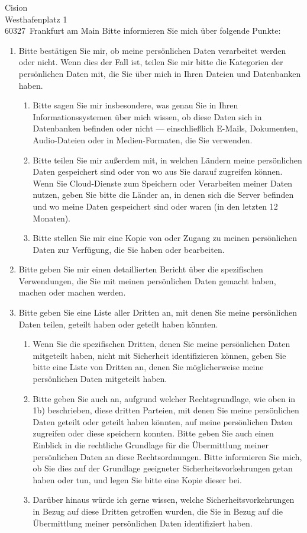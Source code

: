 \documentclass[a4paper, 12pt, KOMAold]{scrlttr2}
\newcommand{\Empfaenger}{Cision}            %
\newcommand{\EStrasse}{Westhafenplatz 1}    %
\newcommand{\EPLZ}{60327}                   %
\newcommand{\EOrt}{Frankfurt am Main}       %
\begin{document}
\begin{letter}{\Empfaenger \\ \EStrasse \\ \EPLZ~\EOrt}
    Bitte informieren Sie mich über folgende Punkte:
    \begin{enumerate}
        \item Bitte bestätigen Sie mir, ob meine persönlichen Daten verarbeitet werden oder nicht. Wenn dies der Fall ist, teilen Sie mir bitte die Kategorien der persönlichen Daten mit, die Sie über mich in Ihren Dateien und Datenbanken haben.
        \begin{enumerate}
            \item Bitte sagen Sie mir insbesondere, was genau Sie in Ihren Informationssystemen über mich wissen, ob diese Daten sich in Datenbanken befinden oder nicht — einschließlich E-Mails, Dokumenten, Audio-Dateien oder in Medien-Formaten, die Sie verwenden.
            \item Bitte teilen Sie mir außerdem mit, in welchen Ländern meine persönlichen Daten gespeichert sind oder von wo aus Sie darauf zugreifen können. Wenn Sie Cloud-Dienste zum Speichern oder Verarbeiten meiner Daten nutzen, geben Sie bitte die Länder an, in denen sich die Server befinden und wo meine Daten gespeichert sind oder waren (in den letzten 12 Monaten).
            \item Bitte stellen Sie mir eine Kopie von oder Zugang zu meinen persönlichen Daten zur Verfügung, die Sie haben oder bearbeiten.
        \end{enumerate}
        \item Bitte geben Sie mir einen detaillierten Bericht über die spezifischen Verwendungen, die Sie mit meinen persönlichen Daten gemacht haben, machen oder machen werden.
        \item Bitte geben Sie eine Liste aller Dritten an, mit denen Sie meine persönlichen Daten teilen, geteilt haben oder geteilt haben könnten.
        \begin{enumerate}
            \item Wenn Sie die spezifischen Dritten, denen Sie meine
            persönlichen Daten mitgeteilt haben, nicht mit Sicherheit
            identifizieren können, geben Sie bitte eine Liste von Dritten an,
            denen Sie möglicherweise meine persönlichen Daten mitgeteilt haben.
            \item Bitte geben Sie auch an, aufgrund welcher Rechtsgrundlage, wie oben in 1b) beschrieben, diese dritten Parteien, mit denen Sie meine persönlichen Daten geteilt oder geteilt haben könnten, auf meine persönlichen Daten zugreifen oder diese speichern konnten. Bitte geben Sie auch einen Einblick in die rechtliche Grundlage für die Übermittlung meiner persönlichen Daten an diese Rechtsordnungen. Bitte informieren Sie mich, ob Sie dies auf der Grundlage geeigneter Sicherheitsvorkehrungen getan haben oder tun, und legen Sie bitte eine Kopie dieser bei.
            \item Darüber hinaus würde ich gerne wissen, welche Sicherheitsvorkehrungen in Bezug auf diese Dritten getroffen wurden, die Sie in Bezug auf die Übermittlung meiner persönlichen Daten identifiziert haben.
        \end{enumerate}


\end{enumerate}
\end{letter}
\end{document}
